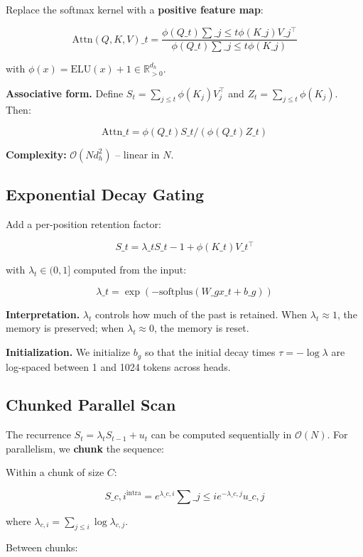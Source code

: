 Replace the softmax kernel with a \textbf{positive feature map}:

\[
\text{Attn}(Q, K, V)\_t = \frac{\phi(Q\_t) \sum\_{j \leq t} \phi(K\_j) V\_j^\top}{\phi(Q\_t) \sum\_{j \leq t} \phi(K\_j)}
\tag{3.2}
\]

with $\phi(x) = \text{ELU}(x) + 1 \in \mathbb{R}_{>0}^{d_h}$.

\textbf{Associative form.} Define $S_t = \sum_{j \leq t} \phi(K_j) V_j^\top$ and 
$Z_t = \sum_{j \leq t} \phi(K_j)$. Then:

\[
\text{Attn}\_t = \phi(Q\_t) S\_t / (\phi(Q\_t) Z\_t)
\tag{3.3}
\]

\textbf{Complexity:} $\mathcal{O}(N d_h^2)$ -- linear in $N$.

\subsection{Exponential Decay Gating}

Add a per-position retention factor:

\[
S\_t = \lambda\_t S\_{t-1} + \phi(K\_t) V\_t^\top
\tag{3.4}
\]

with $\lambda_t \in (0, 1]$ computed from the input:

\[
\lambda\_t = \exp(-\text{softplus}(W\_g x\_t + b\_g))
\tag{3.5}
\]

\textbf{Interpretation.} $\lambda_t$ controls how much of the past is retained. 
When $\lambda_t \approx 1$, the memory is preserved; when $\lambda_t \approx 0$, 
the memory is reset.

\textbf{Initialization.} We initialize $b_g$ so that the initial decay times 
$\tau = -\log \lambda$ are log-spaced between 1 and 1024 tokens across heads.

\subsection{Chunked Parallel Scan}

The recurrence $S_t = \lambda_t S_{t-1} + u_t$ can be computed sequentially 
in $\mathcal{O}(N)$. For parallelism, we \textbf{chunk} the sequence:

Within a chunk of size $C$:

\[
S\_{c, i}^{\text{intra}} = e^{\lambda\_{c, i}} \sum\_{j \leq i} e^{-\lambda\_{c, j}} u\_{c, j}
\tag{3.6}
\]

where $\lambda_{c, i} = \sum_{j \leq i} \log \lambda_{c, j}$.

Between chunks:


